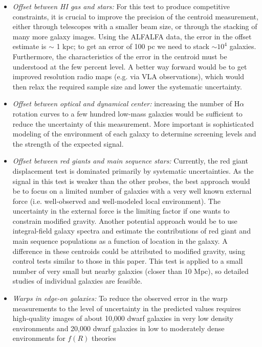 \documentclass[twocolappendix, numberedappendix]{emulateapj}
\newcommand{\ha}{H$\alpha$}
\begin{document}
\begin{itemize}
\item {\it Offset between HI gas and stars:}
  For this test to produce competitive constraints, it is crucial to improve
  the precision of the centroid measurement, either through telescopes with
  a smaller beam size, or through the stacking of many more galaxy images.
  Using the ALFALFA data, the error in the offset estimate is $\sim$ 1 kpc;
  to get an error of 100 pc we need to stack $\sim 10^{4}$
  galaxies.  Furthermore, the characteristics of the error
  in the centroid must be understood at the few percent level. A better way forward
  would be to get improved resolution radio maps (e.g. via VLA observations), 
  which would then relax
  the required sample size and lower the systematic uncertainty. 
\item {\it Offset between optical and dynamical center:}
  increasing the number of \ha~ rotation curves to a few hundred 
  low-mass galaxies would be sufficient to reduce the uncertainty of
  this measurement.  More important is sophisticated
  modeling of the environment of each galaxy to determine screening levels and
  the strength of the expected signal.
\item {\it Offset between red giants and main sequence stars:}
  Currently, the red giant displacement test is dominated primarily by
  systematic uncertainties. As the signal in this test is weaker than the
  other probes, the best approach would be to focus on a limited number
  of galaxies with a very well known external force (i.e. well-observed and
  well-modeled local environment). The uncertainty in the external force is the
  limiting factor if one wants to constrain modified gravity.  Another potential
  approach would be to use integral-field galaxy spectra and estimate the
  contributions of red giant and main sequence populations as a function of
  location in the galaxy.  A difference in these centroids could be
  attributed to modified gravity, using control tests similar to those in
  this paper.  This test is applied to a small number of 
  very small but nearby galaxies (closer than 10 Mpc), so detailed studies of individual 
  galaxies are feasible. 
\item {\it Warps in edge-on galaxies:}
  To reduce the observed error in the warp measurements 
  to the level of uncertainty in the 
  predicted values requires high-quality images
  of about 10,000 dwarf galaxies in very low density environments and 20,000
  dwarf galaxies in low to moderately dense environments for $f(R)$ theories

\end{itemize}
\end{document}
